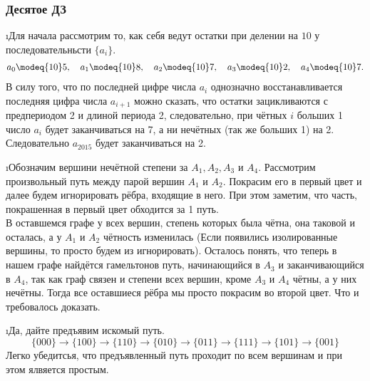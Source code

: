 \subsubsection{Десятое ДЗ}


\i Для начала рассмотрим то, как себя ведут остатки при делении на $10$ у последовательньсти $\{a_i\}$.
\begin{gather*}
    a_0 \modeq{10} 5, \quad a_1 \modeq{10} 8, \quad a_2 \modeq{10} 7, \quad a_3 \modeq{10} 2, \quad a_4 \modeq{10} 7.
\end{gather*}
В силу того, что по последней цифре числа $a_i$ однозначно восстанавливается последняя цифра числа $a_{i+1}$ можно сказать, что остатки зацикливаются с предпериодом 2 и длиной периода 2, следовательно, при чётных $i$ больших 1 число $a_i$ будет заканчиваться на 7, а ни нечётных (так же больших 1) на 2. Следовательно $a_{2015}$ будет заканчиваться на 2.

\i Обозначим вершини нечётной степени за $A_1, A_2, A_3$ и $A_4$. Рассмотрим произвольный путь между парой вершин $A_1$ и $A_2$. Покрасим его в первый цвет и далее будем игнорировать рёбра,  входящие в него. При этом заметим, что часть, покрашенная в первый цвет обходится за 1 путь.\\
В оставшемся графе у всех вершин, степень которых была чётна, она таковой и осталась, а у $A_1$ и $A_2$ чётность изменилась (Если появились изолированные вершины, то просто будем из игнорировать). Осталось понять, что теперь в нашем графе найдётся гамельтонов путь, начинающийся в $A_3$ и заканчивающийся в $A_4$, так как граф связен и степени всех вершин, кроме $A_3$ и $A_4$ чётны, а у них нечётны. Тогда все оставшиеся рёбра мы просто покрасим во второй цвет. Что и требовалось доказать.

\i Да, дайте предъявим искомый путь.
$$\{000\} \rightarrow \{100\} \rightarrow \{110\} \rightarrow \{010\} \rightarrow \{011\} \rightarrow \{111\} \rightarrow \{101\} \rightarrow \{001\}$$
Легко убедитсья, что предъявленный путь проходит по всем вершинам и при этом ялвяется простым.

